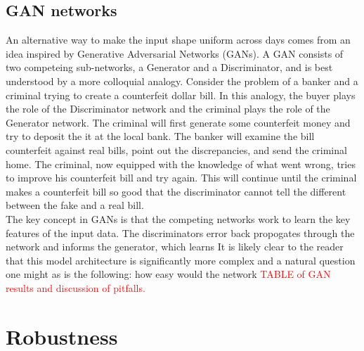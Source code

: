 \documentclass[12pt]{article}
\begin{document}
\subsection{GAN networks}
An alternative way to make the input shape uniform across days comes from an idea inspired by Generative Adversarial Networks (GANs). A GAN consists of two competeing sub-networks, a Generator and a Discriminator, and is best understood by a more colloquial analogy. Consider the problem of a banker and a criminal trying to create a counterfeit dollar bill. In this analogy, the buyer plays the role of the Discriminator network and the criminal plays the role of the Generator network. The criminal will first generate some counterfeit money and try to deposit the it at the local bank. The banker will examine the bill counterfeit against real bills, point out the discrepancies, and send the criminal home. The criminal, now equipped with the knowledge of what went wrong, tries to improve his counterfeit bill and try again. This will continue until the criminal makes a counterfeit bill so good that the discriminator cannot tell the different between the fake and a real bill. \\
The key concept in GANs is that the competing networks work to learn the key features of the input data. The discriminators error back propogates through the network and informs the generator, which learns
It is likely clear to the reader that this model architecture is significantly more complex and a natural question one might as is the following: how easy would the network
\textcolor{red}{TABLE of GAN results and discussion of pitfalls.}
\section*{Robustness}
\end{document}
